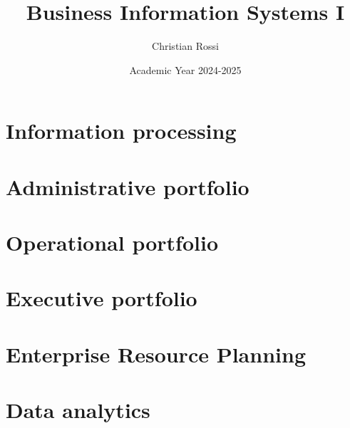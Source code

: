 \documentclass[12pt, a4paper]{report}
\title{\textbf{Business Information Systems I}}
\author{Christian Rossi}
\date{Academic Year 2024-2025}
\begin{document}
    \maketitle

    

    \cleardoublepage{}

    \tableofcontents

    \cleardoublepage{}

    \chapter{Information processing}
    
    
    
    
    

    \chapter{Administrative portfolio}
    

    \chapter{Operational portfolio}
    
    

    \chapter{Executive portfolio}
    
    
    

    \chapter{Enterprise Resource Planning}

    \chapter{Data analytics}
\end{document}
